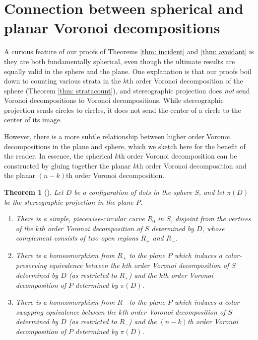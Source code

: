 \documentclass[11pt,oneside]{amsart}
\newtheorem{thm}{Theorem}
\theoremstyle{definition}
\theoremstyle{remark}
\numberwithin{equation}{section}
\begin{document}

\appendix

\section{Connection between spherical and planar Voronoi decompositions}\label{appendix}

A curious feature of our proofs of Theorems \ref{thm: incident} and \ref{thm: avoidant} is they are both fundamentally spherical, even though the ultimate results are equally valid in the sphere and the plane.
%
One explanation is that our proofs boil down to counting various strata in the $k$th order Voronoi decomposition of the sphere (Theorem \ref{thm: stratacount}), and stereographic projection does \emph{not} send Voronoi decompositions to Voronoi decompositions. %
While stereographic projection sends circles to circles, it does not send the center of a circle to the center of its image.

However, there is a more subtle relationship between higher order Voronoi decompositions in the plane and sphere, which we sketch here for the benefit of the reader. In essence, the spherical $k$th order Voronoi decomposition can be constructed by gluing together the planar $k$th order Voronoi decomposition and the planar $(n-k)$th order Voronoi decomposition.

\begin{thm}[\cite{Brown79,NLC02,CHP22}]
Let $D$ be a configuration of dots in the sphere $S$, and let $\pi(D)$ be the stereographic projection in the plane $P$.%
\begin{enumerate}
    \item There is a simple, piecewise-circular curve $R_0$ in $S$, disjoint from the vertices of the $k$th order Voronoi decomposition of $S$ determined by $D$, whose complement consists of two open regions $R_+$ and $R_-$.
    \item There is a homeomorphism from $R_+$ to the plane $P$ which induces a color-preserving equivalence between the $k$th order Voronoi decomposition of $S$ determined by $D$ (as restricted to $R_+$) and the $k$th order Voronoi decomposition of $P$ determined by $\pi(D)$.
    \item There is a homeomorphism from $R_-$ to the plane $P$ which induces a color-swapping equivalence between the $k$th order Voronoi decomposition of $S$ determined by $D$ (as restricted to $R_-$) and the $(n-k)$th order Voronoi decomposition of $P$ determined by $\pi(D)$.
\end{enumerate}
\end{thm}
\end{document}
